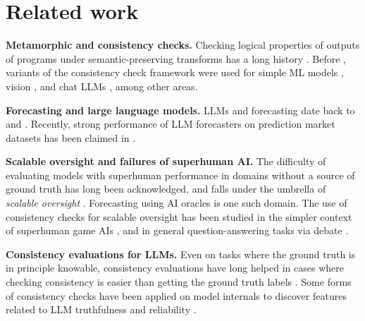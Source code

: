 
\section{Related work}
\label{cfc:app:related}
\textbf{Metamorphic and consistency checks.}
Checking logical properties of outputs of programs under semantic-preserving transforms has a long history \citep{chen1998metamorphic}. Before \citet{esmwcc}, variants of the consistency check framework were used for simple ML models \citep{christakis2022specifying, sharma2020monotonicity}, vision \citep{hendrycks2019benchmarking}, and chat LLMs \citep{jang2023consistency}, among other areas.

\textbf{Forecasting and large language models.}
LLMs and forecasting date back to \citet{zou2022forecasting} and \citet{yan2023autocast++}. Recently, strong performance of LLM forecasters on prediction market datasets has been claimed in .

\textbf{Scalable oversight and failures of superhuman AI.}
The difficulty of evaluating models with superhuman performance in domains without a source of ground truth has long been acknowledged, and falls under the umbrella of \emph{scalable oversight}  \citep{amodei2016concrete}.
Forecasting using AI oracles is one such domain.  The use of consistency checks for scalable oversight has been studied in the simpler context of superhuman game AIs \citep{alphazero_not_robust, esmwcc},
and in general question-answering tasks via debate \citep{irving2018debate}.

\textbf{Consistency evaluations for LLMs.}
Even on tasks where the ground truth is in principle knowable,
consistency evaluations have long helped in cases where checking consistency is easier than getting the ground truth labels \citep{elazarPararel2021, liGeneratorValidatorConsistency2023}.
Some forms of consistency checks have been applied on model internals to discover features related to LLM truthfulness and reliability \citep{burnsDiscoveringLatentKnowledge2022a, kaarelSearchingModelConcepts2023}.
